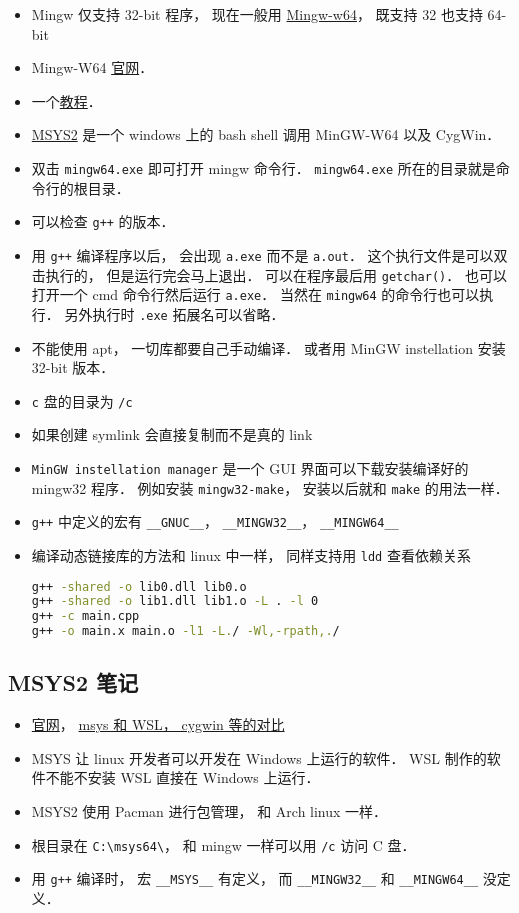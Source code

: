
\begin{itemize}
\item Mingw 仅支持 32-bit 程序， 现在一般用 \href{https://en.wikipedia.org/wiki/Mingw-w64}{Mingw-w64}， 既支持 32 也支持 64-bit
\item Mingw-W64 \href{https://www.mingw-w64.org/}{官网}．
\item 一个\href{https://www3.ntu.edu.sg/home/ehchua/programming/howto/Cygwin_HowTo.html}{教程}．
\item \href{https://www.msys2.org/}{MSYS2} 是一个 windows 上的 bash shell 调用 MinGW-W64 以及 CygWin．
\item 双击 \verb|mingw64.exe| 即可打开 mingw 命令行． \verb|mingw64.exe| 所在的目录就是命令行的根目录．
\item 可以检查 \verb|g++| 的版本．
\item 用 \verb|g++| 编译程序以后， 会出现 \verb|a.exe| 而不是 \verb|a.out|． 这个执行文件是可以双击执行的， 但是运行完会马上退出． 可以在程序最后用 \verb|getchar()|． 也可以打开一个 cmd 命令行然后运行 \verb|a.exe|． 当然在 \verb|mingw64| 的命令行也可以执行． 另外执行时 \verb|.exe| 拓展名可以省略．
\item 不能使用 apt， 一切库都要自己手动编译． 或者用 MinGW instellation 安装 32-bit 版本．
\item \verb|c| 盘的目录为 \verb|/c|
\item 如果创建 symlink 会直接复制而不是真的 link
\item \verb|MinGW instellation manager| 是一个 GUI 界面可以下载安装编译好的 mingw32 程序． 例如安装 \verb|mingw32-make|， 安装以后就和 \verb|make| 的用法一样．
\item \verb|g++| 中定义的宏有 \verb|__GNUC__|， \verb|__MINGW32__|， \verb|__MINGW64__|
\item 编译动态链接库的方法和 linux 中一样， 同样支持用 \verb|ldd| 查看依赖关系
\begin{lstlisting}[language=bash]
g++ -shared -o lib0.dll lib0.o
g++ -shared -o lib1.dll lib1.o -L . -l 0
g++ -c main.cpp
g++ -o main.x main.o -l1 -L./ -Wl,-rpath,./
\end{lstlisting}
\end{itemize}

\subsection{MSYS2 笔记}
\begin{itemize}
\item \href{https://www.msys2.org/}{官网}， \href{https://www.msys2.org/docs/what-is-msys2/}{msys 和 WSL， cygwin 等的对比}
\item MSYS 让 linux 开发者可以开发在 Windows 上运行的软件． WSL 制作的软件不能不安装 WSL 直接在 Windows 上运行．
\item MSYS2 使用 Pacman 进行包管理， 和 Arch linux 一样．
\item 根目录在 \verb|C:\msys64\|， 和 mingw 一样可以用 \verb|/c| 访问 C 盘．
\item 用 \verb|g++| 编译时， 宏 \verb|__MSYS__| 有定义， 而 \verb|__MINGW32__| 和 \verb|__MINGW64__| 没定义．
\end{itemize}
